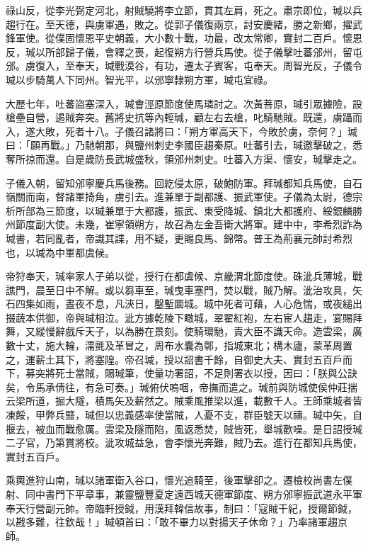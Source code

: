 \begin{pinyinscope}
 祿山反，從李光弼定河北，射賊驍將李立節，貫其左肩，死之。肅宗即位，瑊以兵趨行在。至天德，與虜軍遇，敗之。從郭子儀復兩京，討安慶緒，勝之新鄉，擢武鋒軍使。從僕固懷恩平史朝義，大小數十戰，功最，改太常卿，實封二百戶。懷恩反，瑊以所部歸子儀，會釋之喪，起復朔方行營兵馬使。從子儀擊吐蕃邠州，留屯邠。虜復入，至奉天，瑊戰漠谷，有功，遷太子賓客，屯奉天。周智光反，子儀令瑊以步騎萬人下同州。智光平，以邠寧隸朔方軍，瑊屯宜祿。



 大歷七年，吐蕃盜塞深入，瑊會涇原節度使馬璘討之。次黃菩原，瑊引眾據險，設槍壘自營，遏賊奔突。舊將史抗等內輕瑊，顧左右去槍，叱騎馳賊。既還，虜躡而入，遂大敗，死者十八。子儀召諸將曰：「朔方軍高天下，今敗於虜，奈何？」瑊曰：「願再戰。」乃馳朝那，與鹽州刺史李國臣趨秦原。吐蕃引去，瑊邀擊破之，悉奪所掠而還。自是歲防長武城盛秋，領邠州刺史。吐蕃入方渠、懷安，瑊擊走之。



 子儀入朝，留知邠寧慶兵馬後務。回紇侵太原，破鮑防軍。拜瑊都知兵馬使，自石嶺關而南，督諸軍掎角，虜引去。進兼單于副都護、振武軍使。子儀為太尉，德宗析所部為三節度，以瑊兼單于大都護，振武、東受降城、鎮北大都護府、綏銀麟勝州節度副大使。未幾，崔寧領朔方，故召為左金吾衛大將軍。建中中，李希烈詐為瑊書，若同亂者，帝識其諜，用不疑，更賜良馬、錦幣。普王為荊襄元帥討希烈也，以瑊為中軍都虞候。



 帝狩奉天，瑊率家人子弟以從，授行在都虞候、京畿渭北節度使。硃泚兵薄城，戰譙門，晨至日中不解。或以芻車至，瑊曳車塞門，焚以戰，賊乃解。泚治攻具，矢石四集如雨，晝夜不息，凡浹日，鑿塹圜城。城中死者可藉，人心危惴，或夜縋出掇蔬本供御，帝與瑊相泣。泚方據乾陵下瞰城，翠翟紅袍，左右宦人趨走，宴賜拜舞，又縱慢辭戲斥天子，以為勝在景刻。使騎環馳，責大臣不識天命。造雲梁，廣數十丈，施大輪，濡氈及革冒之，周布水囊為鄣，指城東北；構木廬，蒙革周置之，運薪土其下，將塞隍。帝召瑊，授以詔書千餘，自御史大夫、實封五百戶而下，募突將死士當賊，賜瑊筆，使量功署詔，不足則署衣以授，因曰：「朕與公訣矣，令馬承倩往，有急可奏。」瑊俯伏嗚咽，帝撫而遣之。瑊前與防城使侯仲莊揣云梁所道，掘大隧，積馬矢及薪然之。賊乘風推梁以進，載數千人。王師乘城者皆凍餒，甲弊兵盬，瑊但以忠義感率使當賊，人憂不支，群臣號天以禱。瑊中矢，自揠去，被血而戰愈厲。雲梁及隧而陷，風返悉焚，賊皆死，舉城歡噪。是日詔授瑊二子官，乃第賞將校。泚攻城益急，會李懷光奔難，賊乃去。進行在都知兵馬使，實封五百戶。



 乘輿進狩山南，瑊以諸軍衛入谷口，懷光追騎至，後軍擊卻之。遷檢校尚書左僕射、同中書門下平章事，兼靈鹽豐夏定遠西城天德軍節度、朔方邠寧振武道永平軍奉天行營副元帥。帝臨軒授鉞，用漢拜韓信故事，制曰：「寇賊干紀，授爾節鉞，以戡多難，往欽哉！」瑊頓首曰：「敢不畢力以對揚天子休命？」乃率諸軍趨京師。




\end{pinyinscope}
